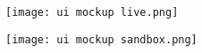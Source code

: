 \begin{figure}[H]
    \centering
    \texttt{[image: ui mockup live.png]}
    \label{img:ui:mockup:live}
\end{figure}

\begin{figure}[H]
    \centering
    \texttt{[image: ui mockup sandbox.png]}
    \label{img:ui:mockup:sandbox}
\end{figure}